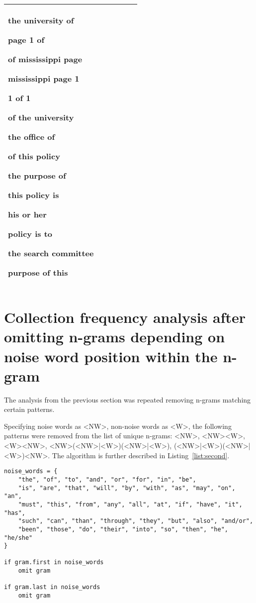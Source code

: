 \documentclass[a4paper,11pt]{article}
\theoremstyle{mytheor}
\begin{document}
\begin{tabular}{|*6{P{0.16}}|}
{\begin{tabitemize}
      \item the university of
      \item page 1 of
      \item of mississippi page
      \item mississippi page 1
      \item 1 of 1
      \item of the university
      \item the office of
      \item of this policy
      \item the purpose of
      \item this policy is
      \item his or her
      \item policy is to
      \item the search committee
      \item purpose of this
      \end{tabitemize}}\\ \hline
\end{tabular}

\section*{Collection frequency analysis after omitting n-grams depending on noise word position within the n-gram}

The analysis from the previous section was repeated removing n-grams matching certain patterns.

Specifying noise words as <NW>, non-noise words as <W>, the following patterns were removed from the list of unique n-grams: <NW>, <NW><W>, <W><NW>, <NW>(<NW>|<W>)(<NW>|<W>), (<NW>|<W>)(<NW>|<W>)<NW>. The algorithm is further described in Listing~\ref{list:second}.

\begin{lstlisting}[label={list:second},caption=Omission of n-grams dependent on noise word position.]
noise_words = {
	"the", "of", "to", "and", "or", "for", "in", "be",
	"is", "are", "that", "will", "by", "with", "as", "may", "on", "an",
	"must", "this", "from", "any", "all", "at", "if", "have", "it", "has",
	"such", "can", "than", "through", "they", "but", "also", "and/or",
	"been", "those", "do", "their", "into", "so", "then", "he", "he/she"
}

if gram.first in noise_words
	omit gram
	
if gram.last in noise_words
	omit gram
\end{lstlisting}
\end{document}

